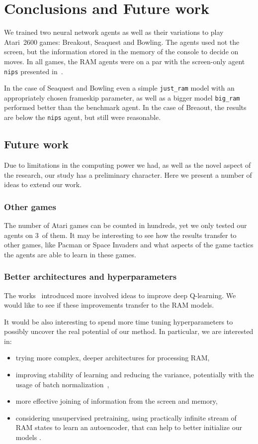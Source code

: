 \chapter{Conclusions and Future work}\label{conclusions}
We trained two neural network agents as well as their variations to play Atari~2600 games: Breakout, Seaquest and Bowling. The agents used not the screen, but the information stored in the memory of the console to decide on moves. In all games, the RAM agents were on a par with the screen-only agent \texttt{nips} presented in~\cite{nips-dqn}.

In the case of Seaquest and Bowling even a simple \texttt{just\_ram} model with an appropriately chosen frameskip parameter, as well as a bigger model \texttt{big\_ram} performed better than the benchmark agent. In the case of Breaout, the results are below the \texttt{nips} agent, but still were reasonable.

\section{Future work}
Due to limitations in the computing power we had, as well as the novel aspect of the research, our study has a preliminary character. Here we present a number of ideas to extend our work.

\subsection{Other games}
The number of Atari games can be counted in hundreds, yet we only tested our agents on $3$~of them. It may be interesting to see how the results transfer to other games, like Pacman or Space Invaders and what aspects of the game tactics the agents are able to learn in these games.

\subsection{Better architectures and hyperparameters}
The works~\cite{nature-dqn, double-dqn, shallow-dqn, duelling-dqn} introduced more 
involved ideas to improve deep Q-learning. We would like to see if these improvements transfer to the RAM models.

It would be also interesting to spend more time tuning hyperparameters to possibly uncover the real potential of our method. In particular, we are interested in:
\begin{itemize}
  \item trying more complex, deeper architectures for processing RAM,
  \item improving stability of learning and reducing the variance, potentially with the usage of batch normalization~\cite{batchnorm},
  \item more effective joining of information from the screen and memory,
  \item considering unsupervised pretraining, using practically infinite stream of RAM states to learn an autoencoder, that can help to better initialize our models \cite{autoencoders}.
\end{itemize}

